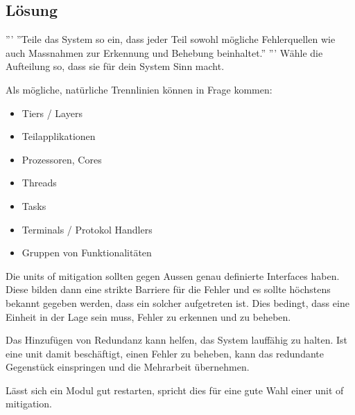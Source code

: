 \subsection{Lösung}

''' ''Teile das System so ein, dass jeder Teil sowohl mögliche Fehlerquellen wie auch Massnahmen zur Erkennung und Behebung beinhaltet.'' ''' Wähle die Aufteilung so, dass sie für dein System Sinn macht.

Als mögliche, natürliche Trennlinien können in Frage kommen:
\begin{itemize}
	\item Tiers / Layers
	\item Teilapplikationen
	\item Prozessoren, Cores
	\item Threads
	\item Tasks
	\item Terminals / Protokol Handlers
	\item Gruppen von Funktionalitäten
\end{itemize}

Die units of mitigation sollten gegen Aussen genau definierte Interfaces haben. Diese bilden dann eine strikte Barriere für die Fehler und es sollte höchstens bekannt gegeben werden, dass ein solcher aufgetreten ist. Dies bedingt, dass eine Einheit in der Lage sein muss, Fehler zu erkennen und zu beheben.

Das Hinzufügen von Redundanz kann helfen, das System lauffähig zu halten. Ist eine unit damit beschäftigt, einen Fehler zu beheben, kann das redundante Gegenstück einspringen und die Mehrarbeit übernehmen.

Lässt sich ein Modul gut restarten, spricht dies für eine gute Wahl einer unit of mitigation.


